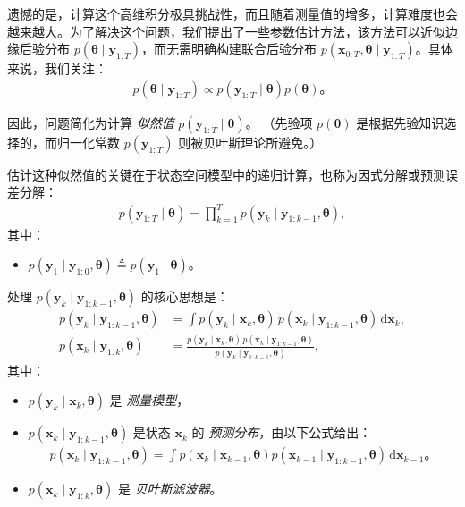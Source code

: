 遗憾的是，计算这个高维积分极具挑战性，而且随着测量值的增多，计算难度也会越来越大。为了解决这个问题，我们提出了一些参数估计方法，该方法可以近似边缘后验分布 \(p(\boldsymbol{\theta} \mid \mathbf{y}_{1:T})\)，而无需明确构建联合后验分布 \(p(\mathbf{x}_{0:T}, \boldsymbol{\theta} \mid \mathbf{y}_{1:T})\)。具体来说，我们关注：
\begin{align*}
p(\boldsymbol{\theta} \mid \mathbf{y}_{1:T}) \propto p(\mathbf{y}_{1:T} \mid \boldsymbol{\theta}) p(\boldsymbol{\theta})。
\end{align*}

因此，问题简化为计算 \textit{似然值} \(p(\mathbf{y}_{1:T} \mid \boldsymbol{\theta})\)。 （先验项 \(p(\boldsymbol{\theta})\) 是根据先验知识选择的，而归一化常数 \(p(\mathbf{y}_{1:T})\) 则被贝叶斯理论所避免。）

估计这种似然值的关键在于状态空间模型中的递归计算，也称为因式分解或预测误差分解：
\begin{align*}
p(\mathbf{y}_{1:T} \mid \boldsymbol{\theta}) = \prod^T_{k=1} p(\mathbf{y}_k \mid \mathbf{y}_{1:k-1}, \boldsymbol{\theta}),
\end{align*}
其中：
\begin{itemize}
\item \(p(\mathbf{y}_1 \mid \mathbf{y}_{1:0}, \boldsymbol{\theta}) \triangleq p(\mathbf{y}_1 \mid \boldsymbol{\theta})\)。
\end{itemize}

处理 \(p(\mathbf{y}_k \mid \mathbf{y}_{1:k-1}, \boldsymbol{\theta})\) 的核心思想是：
\begin{align*}
 p(\mathbf{y}_k \mid \mathbf{y}_{1:k-1}, \boldsymbol{\theta}) &= \int p(\mathbf{y}_k \mid \mathbf{x}_k, \boldsymbol{\theta}) \, p(\mathbf{x}_k \mid \mathbf{y}_{1:k-1}, \boldsymbol{\theta}) \, \mathrm{d} \mathbf{x}_k, \\
 p(\mathbf{x}_k \mid \mathbf{y}_{1:k}, \boldsymbol{\theta}) &= \frac{p(\mathbf{y}_k \mid \mathbf{x}_k, \boldsymbol{\theta}) \, p(\mathbf{x}_k \mid \mathbf{y}_{1:k-1}, \boldsymbol{\theta})}{p(\mathbf{y}_k \mid \mathbf{y}_{1:k-1}, \boldsymbol{\theta})},
\end{align*}
其中：
\begin{itemize}
 \item \(p(\mathbf{y}_k \mid \mathbf{x}_k, \boldsymbol{\theta})\) 是 \textit{测量模型}，
 \item \(p(\mathbf{x}_k \mid \mathbf{y}_{1:k-1}, \boldsymbol{\theta})\) 是状态 \(\mathbf{x}_k\) 的 \textit{预测分布}，由以下公式给出：
\begin{align*}
p(\mathbf{x}_k \mid \mathbf{y}_{1:k-1}, \boldsymbol{\theta}) = \int p(\mathbf{x}_k \mid \mathbf{x}_{k-1}, \boldsymbol{\theta}) p(\mathbf{x}_{k-1} \mid \mathbf{y}_{1:k-1}, \boldsymbol{\theta}) \, \mathrm{d} \mathbf{x}_{k-1}。
\end{align*}
\item \(p(\mathbf{x}_k \mid \mathbf{y}_{1:k}, \boldsymbol{\theta})\) 是 \textit{贝叶斯滤波器}。
\end{itemize}


